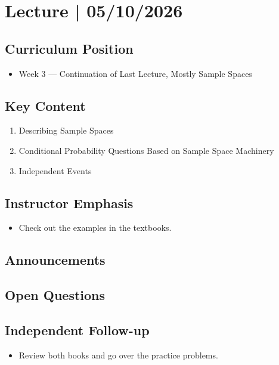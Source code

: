 \section{Lecture | 05/10/2026}


\subsection*{Curriculum Position}
\begin{itemize}
	\item Week 3 — Continuation of Last Lecture, Mostly Sample Spaces
\end{itemize}


\subsection*{Key Content}
\begin{enumerate}
	\item Describing Sample Spaces
    \item Conditional Probability Questions Based on Sample Space Machinery  
    \item Independent Events 
\end{enumerate}


\subsection*{Instructor Emphasis}
\begin{itemize}
	\item Check out the examples in the textbooks.
\end{itemize} 


\subsection*{Announcements}



\subsection*{Open Questions}


\subsection*{Independent Follow-up}
\begin{itemize}
	\item Review both books and go over the practice problems.
	
\end{itemize}
